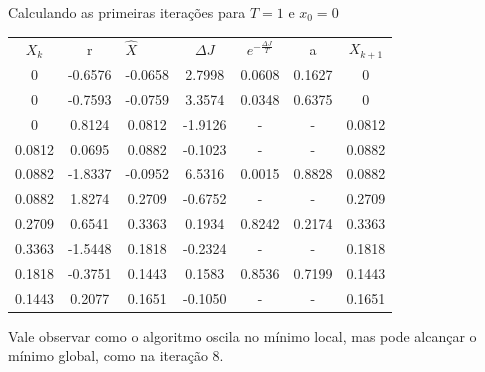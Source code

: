 \documentclass[12pt]{article}
\newenvironment{exercise}[2][Exercício]{\begin{trivlist}
\item[\hskip \labelsep {\bfseries #1}\hskip \labelsep {\bfseries #2.}]}{\end{trivlist}}
\begin{document}
\begin{exercise}{4}
Calculando as primeiras iterações para $T = 1$ e $x_0 = 0$
\begin{table}[H]
\centering
\begin{tabular}{ccccccc}
$X_k$  & r       & \multicolumn{1}{l}{$\hat{X}$} & $\Delta J$ & $e^{-\frac{\Delta J}{T}}$ & a      & $X_{k+1}$ \\
0      & -0.6576 & -0.0658                       & 2.7998     & 0.0608                    & 0.1627 & 0         \\
0      & -0.7593 & -0.0759                       & 3.3574     & 0.0348                    & 0.6375 & 0         \\
0      & 0.8124  & 0.0812                        & -1.9126    & -                         & -      & 0.0812    \\
0.0812 & 0.0695  & 0.0882                        & -0.1023    & -                         & -      & 0.0882    \\
0.0882 & -1.8337 & -0.0952                       & 6.5316     & 0.0015                    & 0.8828 & 0.0882    \\
0.0882 & 1.8274  & 0.2709                        & -0.6752    & -                         & -      & 0.2709    \\
0.2709 & 0.6541  & 0.3363                        & 0.1934     & 0.8242                    & 0.2174 & 0.3363    \\
0.3363 & -1.5448 & 0.1818                        & -0.2324    & -                         & -      & 0.1818    \\
0.1818 & -0.3751 & 0.1443                        & 0.1583     & 0.8536                    & 0.7199 & 0.1443    \\
0.1443 & 0.2077  & 0.1651                        & -0.1050    & -                         & -      & 0.1651   
\end{tabular}
\end{table}
Vale observar como o algoritmo oscila no mínimo local, mas pode alcançar o
mínimo global, como na iteração 8. 
\end{exercise}
\end{document}
